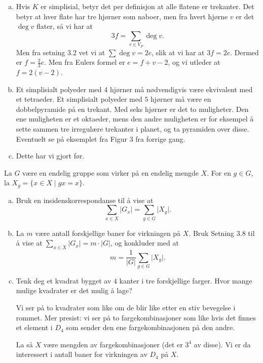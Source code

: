\documentclass[11pt, norsk]{article}
\begin{document}
\begin{losn}
\begin{enumerate}[a)]
\item Hvis $K$ er simplisial, betyr det per definisjon at alle flatene er trekanter. Det betyr at hver flate har tre hjørner som naboer, men fra hvert hjørne $v$ er det $\deg v$ flater, så vi har at \[
3f = \sum_{v \in V_P} \deg v.
\] 
Men fra setning 3.2 vet vi at $\sum \deg v = 2e$, slik at vi har at $3f=2e$. Dermed er $f=\frac 23 e$. Men fra Eulers formel er $e=f+v-2$, og vi utleder at $f=2(v-2)$. 
\item Et simplisialt polyeder med $4$ hjørner må nødvendigvis være ekvivalent med et tetraeder. Et simplisialt polyeder med $5$ hjørner må være en dobbelpyramide på en trekant. Med seks hjørner er det to muligheter. Den ene muligheten er et oktaeder, mens den andre muligheten er for eksempel å sette sammen tre irregulære trekanter i planet, og ta pyramiden over disse. Eventuelt se på eksemplet fra Figur 3 fra forrige gang.
\item Dette har vi gjort før.
  \end{enumerate}
\end{losn}

\begin{oppg}
 La $G$ være en endelig gruppe som virker på en endelig mengde $X$. For en $g \in G$, la $X_g = \{x \in X \mid gx = x \}$.
 \begin{enumerate}[a)]
 \item Bruk en insidenskorrespondanse til å vise at
\[
\sum_{x \in X} \lvert G_x \rvert  = \sum_{g \in G} \lvert X_g \rvert.
\]
\item La $m$ være antall forskjellige baner for virkningen på $X$. Bruk Setning 3.8 til å vise at $\sum_{x \in X} \lvert G_x \rvert = m \cdot \lvert G \rvert$, og konkluder med at 
\[
m = \frac{1}{\lvert G \rvert } \sum_{g \in G} \lvert X_g \rvert.
\]
\item Tenk deg et kvadrat bygget av $4$ kanter i tre forskjellige farger. Hvor mange mulige kvadrater er det mulig å lage? 

Vi ser på to kvadrater som like om de blir like etter en stiv bevegelse i rommet. Mer presist: vi ser på to fargekombinasjoner som like hvis det finnes et element i $D_4$ som sender den ene fargekombinasjonen på den andre.

La så $X$ være mengden av fargekombinasjoner (det er $3^4$ av disse). Vi er da interessert i antall baner for virkningen av $D_4$ på $X$. 
 \end{enumerate}
\end{oppg}
\end{document}
